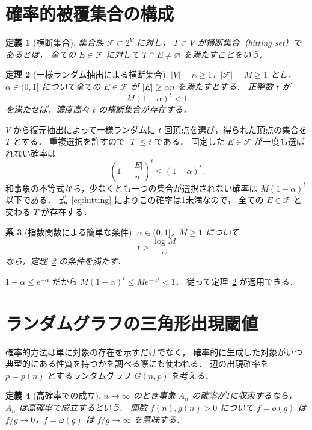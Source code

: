 \documentclass[a5paper,10pt,onecolumn]{jsarticle}
\makeatletter
\theoremstyle{mathnotetheorem}
\newtheorem{theorem}{定理}[section]
\newtheorem{definition}[theorem]{定義}
\newtheorem{corollary}[theorem]{系}
\renewcommand{\proofname}{証明}
\renewenvironment{proof}[1][\proofname]{%
  \par\pushQED{\qed}\normalfont\topsep4\p@\@plus2\p@\relax
  \trivlist\item[\hskip\labelsep\bfseries #1]\ignorespaces
}{\popQED\endtrivlist\@endpefalse}
\makeatother
\begin{document}
\section{確率的被覆集合の構成}
\begin{definition}[横断集合]
集合族 $\mathcal F\subset2^V$ に対し，
$T\subset V$ が\emph{横断集合}（hitting set）であるとは，
全ての $E\in\mathcal F$ に対して
$T\cap E\ne\varnothing$ を満たすことをいう．
\end{definition}

\begin{theorem}[一様ランダム抽出による横断集合]\label{thm:hittingset}
$|V|=n\ge1$，$|\mathcal F|=M\ge1$ とし，
$\alpha\in(0,1]$ について全ての $E\in\mathcal F$ が
$|E|\ge\alpha n$ を満たすとする．
正整数 $t$ が
\begin{equation}\label{eq:hitting}
 M(1-\alpha)^t<1
\end{equation}
を満たせば，濃度高々 $t$ の横断集合が存在する．
\end{theorem}
\begin{proof}
$V$ から復元抽出によって一様ランダムに
$t$ 回頂点を選び，得られた頂点の集合を $T$ とする．
重複選択を許すので $|T|\le t$ である．
固定した $E\in\mathcal F$ が一度も選ばれない確率は
\[
 \left(1-\frac{|E|}{n}\right)^t\le(1-\alpha)^t.
\]
和事象の不等式から，少なくとも一つの集合が選択されない確率は
$M(1-\alpha)^t$ 以下である．
式~\eqref{eq:hitting} によりこの確率は1未満なので，
全ての $E\in\mathcal F$ と交わる $T$ が存在する．
\end{proof}

\begin{corollary}[指数関数による簡単な条件]
$\alpha\in(0,1]$，$M\ge1$ について
\[
 t>\frac{\log M}{\alpha}
\]
なら，定理~\ref{thm:hittingset} の条件を満たす．
\end{corollary}
\begin{proof}
$1-\alpha\le e^{-\alpha}$ だから
$M(1-\alpha)^t\le Me^{-\alpha t}<1$．
従って定理~\ref{thm:hittingset} が適用できる．
\end{proof}

\section{ランダムグラフの三角形出現閾値}
確率的方法は単に対象の存在を示すだけでなく，
確率的に生成した対象がいつ典型的にある性質を持つかを調べる際にも使われる．
辺の出現確率を $p=p(n)$ とするランダムグラフ $G(n,p)$ を考える．

\begin{definition}[高確率での成立]
$n\to\infty$ のとき事象 $A_n$ の確率が1に収束するなら，
$A_n$ は\emph{高確率で}成立するという．
関数 $f(n),g(n)>0$ について
$f=o(g)$ は $f/g\to0$，$f=\omega(g)$ は $f/g\to\infty$ を意味する．
\end{definition}
\end{document}
